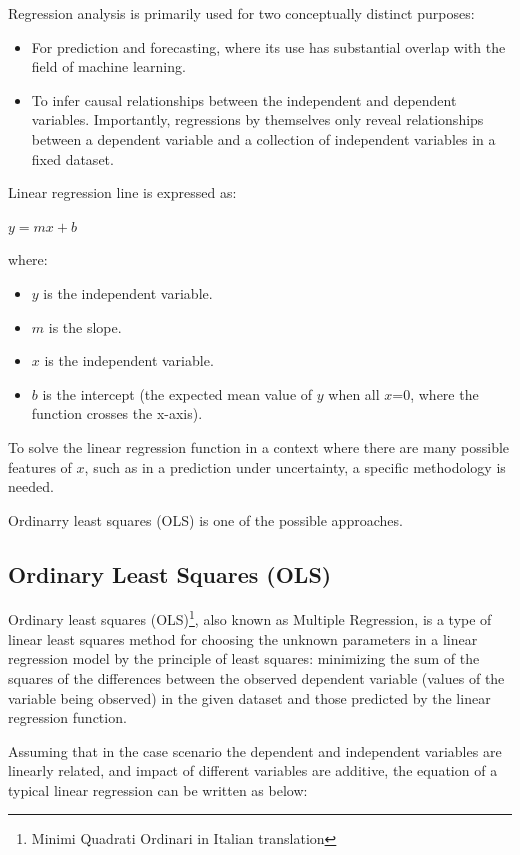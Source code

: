 \documentclass{article}
\begin{document}
Regression analysis is primarily used for two conceptually distinct purposes:
\begin{itemize}
    \item For prediction and forecasting, where its use has substantial overlap with the field of machine learning.
    \item To infer causal relationships between the independent and dependent variables. Importantly, regressions by themselves only reveal relationships between a dependent variable and a collection of independent variables in a fixed dataset.
\end{itemize}

Linear regression line is expressed as:

$y = mx + b$

where:
\begin{itemize}
    \item $y$ is the independent variable.
    \item $m$ is the slope.
    \item $x$ is the independent variable.
    \item $b$ is the intercept (the expected mean value of $y$ when all $x$=0, where the function crosses the x-axis).
\end{itemize}

To solve the linear regression function in a context where there are many possible features of $x$, such as in a prediction under uncertainty, a specific methodology is needed. 

Ordinarry least squares (OLS) is one of the possible approaches.

\subsection{Ordinary Least Squares (OLS)}
Ordinary least squares (OLS)\footnote{Minimi Quadrati Ordinari in Italian translation}, also known as Multiple Regression, is a type of linear least squares method for choosing the unknown parameters in a linear regression model by the principle of least squares: minimizing the sum of the squares of the differences between the observed dependent variable (values of the variable being observed) in the given dataset and those predicted by the linear regression function.

Assuming that in the case scenario the dependent and independent variables are linearly related, and impact of different variables are additive, the equation of a typical linear regression can be written as below:
\end{document}
